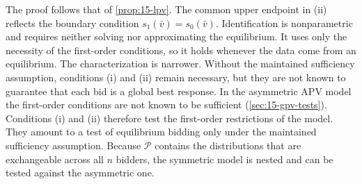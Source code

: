 The proof follows that of \cref{prop:15-lpv}. The common upper endpoint in (ii) reflects the boundary
condition $s_1(\bar v)=s_0(\bar v)$. Identification is nonparametric and requires neither solving nor
approximating the equilibrium. It uses only the necessity of the first-order conditions, so it holds whenever
the data come from an equilibrium. The characterization is narrower. Without the maintained sufficiency
assumption, conditions (i) and (ii) remain necessary, but they are not known to guarantee that each bid is a
global best response. In the asymmetric APV model the first-order conditions are not known to be sufficient
(\cref{sec:15-gpv-tests}). Conditions (i) and (ii) therefore test the first-order restrictions of the model. They
amount to a test of equilibrium bidding only under the maintained sufficiency assumption. Because $\mathcal P$ contains the distributions that are exchangeable across all
$n$ bidders, the symmetric model is nested and can be tested against the asymmetric one.


